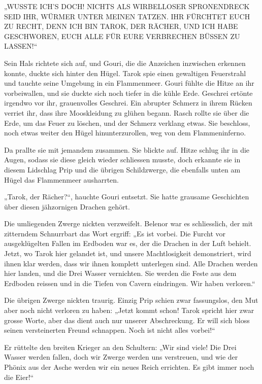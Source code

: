 „WUSSTE ICH’S DOCH! NICHTS ALS WIRBELLOSER SPRONENDRECK SEID IHR, WÜRMER UNTER MEINEN TATZEN. IHR FÜRCHTET EUCH ZU RECHT, DENN ICH BIN TAROK, DER RÄCHER, UND ICH HABE GESCHWOREN, EUCH ALLE FÜR EURE VERBRECHEN BÜSSEN ZU LASSEN!“

Sein Hals richtete sich auf, und Gouri, die die Anzeichen inzwischen erkennen konnte, duckte sich hinter den Hügel. Tarok spie einen gewaltigen Feuerstrahl und tauchte seine Umgebung in ein Flammenmeer. Gouri fühlte die Hitze an ihr vorbeiwallen, und sie duckte sich noch tiefer in die kühle Erde. Geschrei ertönte irgendwo vor ihr, grauenvolles Geschrei. Ein abrupter Schmerz in ihrem Rücken verriet ihr, dass ihre Mooskleidung zu glühen begann. Rasch rollte sie über die Erde, um das Feuer zu löschen, und der Schmerz verklang etwas. Sie beschloss, noch etwas weiter den Hügel hinunterzurollen, weg von dem Flammeninferno.

Da prallte sie mit jemandem zusammen. Sie blickte auf. Hitze schlug ihr in die Augen, sodass sie diese gleich wieder schliessen musste, doch erkannte sie in diesem Lidschlag Prip und die übrigen Schildzwerge, die ebenfalls unten am Hügel das Flammenmeer ausharrten.

„Tarok, der Rächer?“, hauchte Gouri entsetzt. Sie hatte grausame Geschichten über diesen jähzornigen Drachen gehört.

Die umliegenden Zwerge nickten verzweifelt. Belenor war es schliesslich, der mit zitterndem Schnurrbart das Wort ergriff: „Es ist vorbei. Die Furcht vor ausgeklügelten Fallen im Erdboden war es, der die Drachen in der Luft behielt. Jetzt, wo Tarok hier gelandet ist, und unsere Machtlosigkeit demonstriert, wird ihnen klar werden, dass wir ihnen komplett unterlegen sind. Alle Drachen werden hier landen, und die Drei Wasser vernichten. Sie werden die Feste aus dem Erdboden reissen und in die Tiefen von Cavern eindringen. Wir haben verloren.“

Die übrigen Zwerge nickten traurig. Einzig Prip schien zwar fassungslos, den Mut aber noch nicht verloren zu haben: „Jetzt kommt schon! Tarok spricht hier zwar grosse Worte, aber das dient auch nur unserer Abschreckung. Er will sich bloss seinen versteinerten Freund schnappen. Noch ist nicht alles vorbei!“

Er rüttelte den breiten Krieger an den Schultern: „Wir sind viele! Die Drei Wasser werden fallen, doch wir Zwerge werden uns verstreuen, und wie der Phönix aus der Asche werden wir ein neues Reich errichten. Es gibt immer noch die Eier!“

